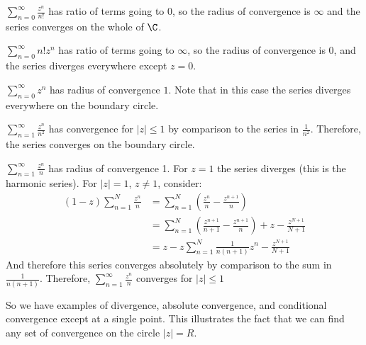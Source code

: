 \documentclass[../Main.tex]{subfiles}
\begin{document}
\begin{examples}{}
    \item $\sum_{n=0}^\infty \frac{z^n}{n!}$ has ratio of terms going to $0$, so the radius of convergence is $\infty$ and the series converges on the whole of $\C$.
    \item $\sum_{n=0}^\infty n! z^n$ has ratio of terms going to $\infty$, so the radius of convergence is $0$, and the series diverges everywhere except $z = 0$.
    \item $\sum_{n=0}^\infty z^n$ has radius of convergence $1$. Note that in this case the series diverges everywhere on the boundary circle.
    \item $\sum_{n=1}^\infty \frac{z^n}{n^2}$ has convergence for $|z| \leq 1$ by comparison to the series in $\frac{1}{n^2}$. Therefore, the series converges on the boundary circle.
    \item $\sum_{n=1}^\infty \frac{z^n}{n}$ has radius of convergence 1. For $z = 1$ the series diverges (this is the harmonic series). For $|z| = 1$, $z \neq 1$, consider:
        \begin{align*}
		(1-z)\sum_{n=1}^N \frac{z^n}{n} &= \sum_{n=1}^N \left(\frac{z^n}{n} - \frac{z^{n+1}}{n}\right) \\
		&= \sum_{n=1}^N \left(\frac{z^{n+1}}{n+1} - \frac{z^{n+1}}{n}\right) + z - \frac{z^{N+1}}{N+1} \\
		&= z - z \sum_{n=1}^N \frac{1}{n(n+1)} z^n - \frac{z^{N+1}}{N+1}
	\end{align*}
	And therefore this series converges absolutely by comparison to the sum in $\frac{1}{n(n+1)}$. Therefore, $\sum_{n=1}^\infty \frac{z^n}{n}$ converges for $|z| \leq 1$
\end{examples}
So we have examples of divergence, absolute convergence, and conditional convergence except at a single point. This illustrates the fact that we can find any set of convergence on the circle $|z| = R$.
\end{document}
